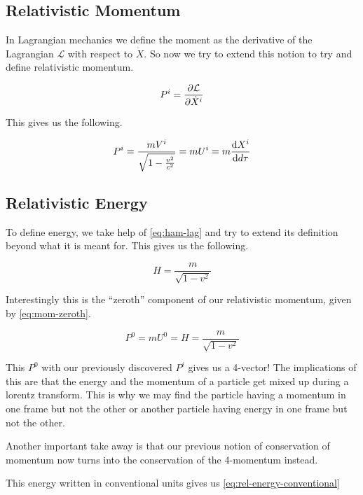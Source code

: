 \documentclass[16pt]{scrartcl}
\numberwithin{equation}{section}
\theoremstyle{plain}
\theoremstyle{definition}
\begin{document}
\subsection{Relativistic Momentum}

In Lagrangian mechanics we define the moment as the derivative of the Lagrangian $\mathcal{L}$ with respect to $\dot X$. So now we try to extend this notion to try and define relativistic momentum.

\begin{equation}
    P^i = \pdv{\mathcal{L}}{\dot X^i}
    \label{eq:rel-momentum}
\end{equation}

This gives us the following.

\begin{equation}
    P^i = \frac{mV^i}{\sqrt{1- \frac{v^2}{c^2}}} = mU^i = m \dv{X^i}{d\tau}
    \label{eq:rel-momentum-2}
\end{equation}

\subsection{Relativistic Energy}

To define energy, we take help of \eqref{eq:ham-lag} and try to extend its definition beyond what it is meant for. This gives us the following.

\begin{equation}
    H = \frac{m}{\sqrt{1-v^2}}
    \label{eq:rel-energy}
\end{equation}

Interestingly this is the ``zeroth'' component of our relativistic momentum, given by \eqref{eq:mom-zeroth}.

\begin{equation}
    P^0 = mU^0 = H = \frac{m}{\sqrt{1-v^2}} 
    \label{eq:mom-zeroth}
\end{equation}
 
This $P^0$ with our previously discovered $P^i$ gives us a 4-vector! The implications of this are that the energy and the momentum of a particle get mixed up during a lorentz transform. This is why
we may find the particle having a momentum in one frame but not the other or another particle having energy in one frame but not the other. 

Another important take away is that our previous notion of conservation of momentum now turns into the conservation of the 4-momentum instead.

This energy written in conventional units gives us \eqref{eq:rel-energy-conventional}
\end{document}
